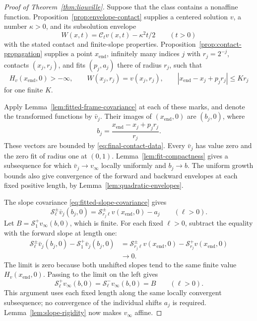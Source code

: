 \documentclass[11pt]{article}
\numberwithin{equation}{section}
\theoremstyle{definition}
\theoremstyle{remark}
\newcommand{\Cenv}{\mathcal{C}}
\newcommand{\Senv}{\mathcal{S}}
\begin{document}
\begin{proof}[Proof of Theorem~\ref{thm:liouville}]
Suppose that the class contains a nonaffine function. Proposition~\ref{prop:envelope-contact} supplies a centered solution $v$, a number $\kappa>0$, and its subsolution envelope
\[
  W(x,t)=\Cenv_t v(x,t)-\kappa^2t/2\qquad(t>0)
\]
with the stated contact and finite-slope properties. Proposition~\ref{prop:contact-propagation} supplies a point $x_{\mathrm{end}}$, infinitely many indices $j$ with $r_j=2^{-j}$, contacts $(x_j,r_j)$, and fits $(p_j,a_j)$ there of radius $r_j$, such that
\begin{equation}\label{eq:final-contact-data}
  H_v(x_{\mathrm{end}},0)>-\infty,\qquad
  W(x_j,r_j)=v(x_j,r_j),\qquad
  |x_{\mathrm{end}}-x_j+p_jr_j|\le K r_j
\end{equation}
for one finite $K$.

Apply Lemma~\ref{lem:fitted-frame-covariance} at each of these marks, and denote the transformed functions by $\bar v_j$. Their images of $(x_{\mathrm{end}},0)$ are $(b_j,0)$, where
\[
  b_j=\frac{x_{\mathrm{end}}-x_j+p_jr_j}{r_j}.
\]
These vectors are bounded by \eqref{eq:final-contact-data}. Every $\bar v_j$ has value zero and the zero fit of radius one at $(0,1)$. Lemma~\ref{lem:fit-compactness} gives a subsequence for which $\bar v_j\to v_\infty$ locally uniformly and $b_j\to b$. The uniform growth bounds also give convergence of the forward and backward envelopes at each fixed positive length, by Lemma~\ref{lem:quadratic-envelopes}.

The slope covariance \eqref{eq:fitted-slope-covariance} gives
\[
  \Senv_\ell^\pm\bar v_j(b_j,0)
    =\Senv_{r_j\ell}^\pm v(x_{\mathrm{end}},0)-a_j
       \qquad(\ell>0).
\]
Let $B=\Senv_1^+v_\infty(b,0)$, which is finite. For each fixed $\ell>0$, subtract the equality with the forward slope at length one:
\begin{align*}
  \Senv_\ell^\pm\bar v_j(b_j,0)-\Senv_1^+\bar v_j(b_j,0)
   &=\Senv_{r_j\ell}^\pm v(x_{\mathrm{end}},0)
        -\Senv_{r_j}^+v(x_{\mathrm{end}},0)\\
   &\longrightarrow0.
\end{align*}
The limit is zero because both unshifted slopes tend to the same finite value $H_v(x_{\mathrm{end}},0)$. Passing to the limit on the left gives
\[
  \Senv_\ell^+v_\infty(b,0)=\Senv_\ell^-v_\infty(b,0)=B
       \qquad(\ell>0).
\]
This argument uses each fixed length along the same locally convergent subsequence; no convergence of the individual shifts $a_j$ is required. Lemma~\ref{lem:slope-rigidity} now makes $v_\infty$ affine.


\end{proof}
\end{document}
